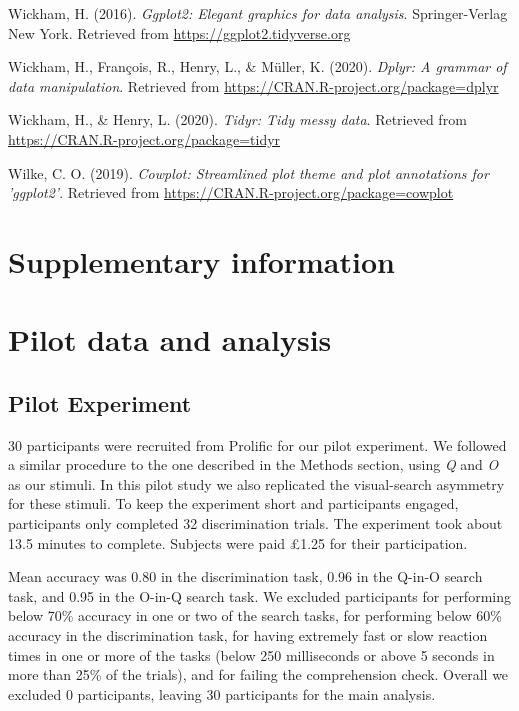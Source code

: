 \documentclass[
  english,
  man,floatsintext]{apa6}
\begin{document}
\leavevmode\hypertarget{ref-R-ggplot2}{}%
Wickham, H. (2016). \emph{Ggplot2: Elegant graphics for data analysis}. Springer-Verlag New York. Retrieved from \url{https://ggplot2.tidyverse.org}

\leavevmode\hypertarget{ref-R-dplyr}{}%
Wickham, H., François, R., Henry, L., \& Müller, K. (2020). \emph{Dplyr: A grammar of data manipulation}. Retrieved from \url{https://CRAN.R-project.org/package=dplyr}

\leavevmode\hypertarget{ref-R-tidyr}{}%
Wickham, H., \& Henry, L. (2020). \emph{Tidyr: Tidy messy data}. Retrieved from \url{https://CRAN.R-project.org/package=tidyr}

\leavevmode\hypertarget{ref-R-cowplot}{}%
Wilke, C. O. (2019). \emph{Cowplot: Streamlined plot theme and plot annotations for 'ggplot2'}. Retrieved from \url{https://CRAN.R-project.org/package=cowplot}

\endgroup

\newpage

\hypertarget{supplementary-information}{%
\section{Supplementary information}\label{supplementary-information}}

\hypertarget{pilot-data-and-analysis}{%
\section{Pilot data and analysis}\label{pilot-data-and-analysis}}

\hypertarget{pilot-experiment}{%
\subsection{Pilot Experiment}\label{pilot-experiment}}

30 participants were recruited from Prolific for our pilot experiment. We followed a similar procedure to the one described in the Methods section, using \emph{Q} and \emph{O} as our stimuli. In this pilot study we also replicated the visual-search asymmetry for these stimuli. To keep the experiment short and participants engaged, participants only completed 32 discrimination trials. The experiment took about 13.5 minutes to complete. Subjects were paid £1.25 for their participation.

Mean accuracy was 0.80 in the discrimination task, 0.96 in the Q-in-O search task, and 0.95 in the O-in-Q search task. We excluded participants for performing below 70\% accuracy in one or two of the search tasks, for performing below 60\% accuracy in the discrimination task, for having extremely fast or slow reaction times in one or more of the tasks (below 250 milliseconds or above 5 seconds in more than 25\% of the trials), and for failing the comprehension check. Overall we excluded 0 participants, leaving 30 participants for the main analysis.
\end{document}
